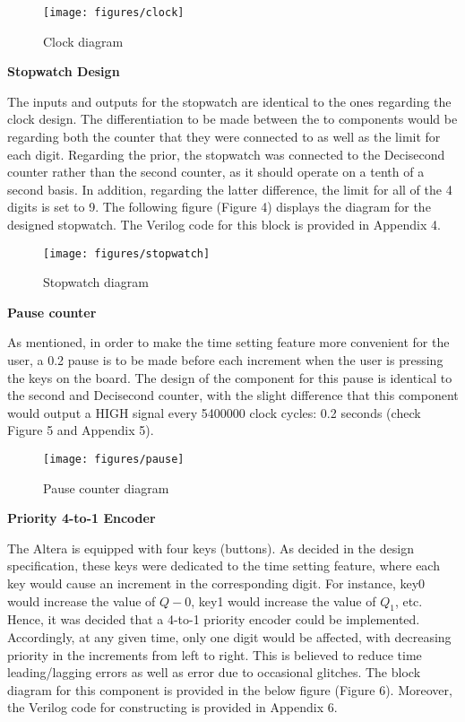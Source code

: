 \documentclass[12pt,a4paper]{article}
\begin{document}
	\begin{figure}[H]
		\centering
		\texttt{[image: figures/clock]}
		\caption{Clock diagram}
	\end{figure}
\vspace{-0.4cm}
	 
	\noindent \textbf{\large Stopwatch Design}
	\vspace{0.2cm}
	
	\noindent The inputs and outputs for the stopwatch are identical to the ones regarding the clock design. The differentiation to be made between the to components would be regarding both the counter that they were connected to as well as the limit for each digit. Regarding the prior, the stopwatch was connected to the Decisecond counter rather than the second counter, as it should operate on a tenth of a second basis. In addition, regarding the latter difference, the limit for all of the 4 digits is set to 9. The following figure (Figure 4) displays the diagram for the designed stopwatch. The Verilog code for this block is provided in Appendix 4.
	
	\begin{figure}[H]
		\centering
		\texttt{[image: figures/stopwatch]}
		\caption{Stopwatch diagram}
	\end{figure}

	\noindent \textbf{\large Pause counter}
	\vspace{0.2cm}
	
	\noindent As mentioned, in order to make the time setting feature more convenient for the user, a 0.2 pause is to be made before each increment when the user is pressing the keys on the board. The design of the component for this pause is identical to the second and Decisecond counter, with the slight difference that this component would output a HIGH signal every 5400000 clock cycles: 0.2 seconds (check Figure 5 and Appendix 5).

	\begin{figure}[H]
		\centering
		\texttt{[image: figures/pause]}
		\caption{Pause counter diagram}
	\end{figure}
	\noindent \textbf{\large Priority 4-to-1 Encoder}
	\vspace{0.2cm}
	
	\noindent The Altera is equipped with four keys (buttons). As decided in the design specification, these keys were dedicated to the time setting feature, where each key would cause an increment in the corresponding digit. For instance, key0 would increase the value of $Q-{0}$, key1 would increase the value of $Q_{1}$, etc. Hence, it was decided that a 4-to-1 priority encoder could be implemented. Accordingly, at any given time, only one digit would be affected, with decreasing priority in the increments from left to right. This is believed to reduce time leading/lagging errors as well as error due to occasional glitches. The block diagram for this component is provided in the below figure (Figure 6). Moreover, the Verilog code for constructing is provided in Appendix 6.
	
\end{document}
